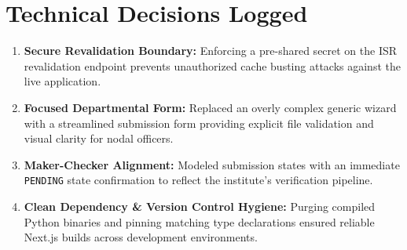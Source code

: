 \documentclass[11pt,a4paper]{article}
\begin{document}
\section*{Technical Decisions Logged}
\begin{enumerate}[leftmargin=1.6em, itemsep=2pt]
\item \textbf{Secure Revalidation Boundary:} Enforcing a pre-shared secret on the ISR revalidation endpoint prevents unauthorized cache busting attacks against the live application.
\item \textbf{Focused Departmental Form:} Replaced an overly complex generic wizard with a streamlined submission form providing explicit file validation and visual clarity for nodal officers.
\item \textbf{Maker-Checker Alignment:} Modeled submission states with an immediate \texttt{PENDING} state confirmation to reflect the institute's verification pipeline.
\item \textbf{Clean Dependency \& Version Control Hygiene:} Purging compiled Python binaries and pinning matching type declarations ensured reliable Next.js builds across development environments.
\end{enumerate}
\end{document}
